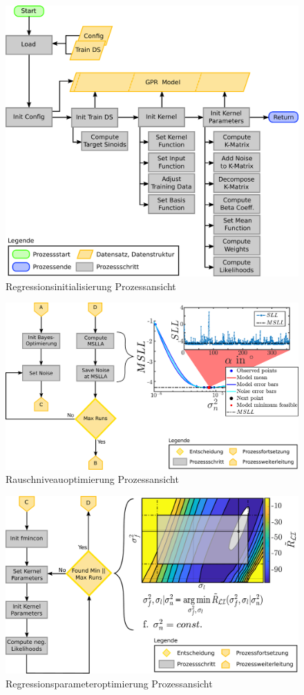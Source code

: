 \begin{figure}[htbp]
	\centering
	\includegraphics[width=0.7\linewidth]{chapters/images/3-SW-E-OExp/GPR_Initialization}
	\caption[Regressionsinitialisierung Prozessansicht]{Regressionsinitialisierung Prozessansicht}
	\label{fig:gprinitialization}
\end{figure}


\begin{figure}[tbph]
	\centering
	\includegraphics[width=0.85\linewidth]{chapters/images/3-SW-E-OExp/Noise_Optimization}
	\caption[Rauschniveauoptimierung Prozessansicht]{Rauschniveauoptimierung Prozessansicht}
	\label{fig:noiseoptimization}
\end{figure}


\begin{figure}[tbph]
	\centering
	\includegraphics[width=0.8\linewidth]{chapters/images/3-SW-E-OExp/Kernel_Tuning}
	\caption[Regressionsparameteroptimierung Prozessansicht]{Regressionsparameteroptimierung Prozessansicht}
	\label{fig:kerneltuning}
\end{figure}

\clearpage
